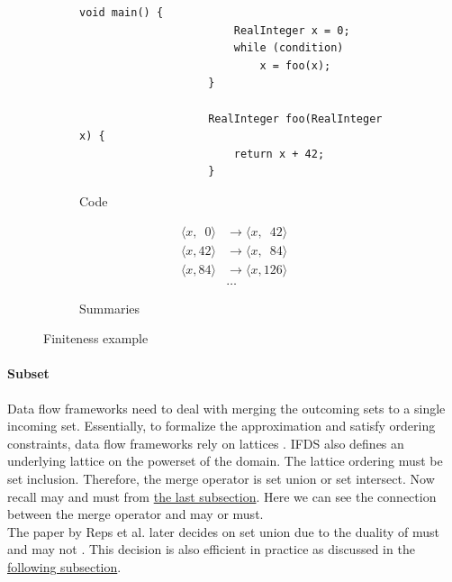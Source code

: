 \documentclass[../draft.tex]{subfiles}
\begin{document}
    \begin{figure}[ht]
        \centering
        \begin{subfigure}[b]{0.45\textwidth}
            \centering
            \begin{adjustbox}{max width=\columnwidth}
                \begin{lstlisting}[gobble=20, morekeywords={RealInteger}]
                    void main() {
                        RealInteger x = 0;
                        while (condition)
                            x = foo(x);
                    }
                    
                    RealInteger foo(RealInteger x) {
                        return x + 42;
                    }
                \end{lstlisting}
            \end{adjustbox}
            \caption{Code}
        \end{subfigure}
        \qquad
        \begin{subfigure}[b]{0.45\textwidth}
            \centering
            $$
                \begin{aligned}
                    \langle x, \phantom{0}0 \rangle &\rightarrow \langle x, \phantom{1}42 \rangle\\
                    \langle x, 42 \rangle &\rightarrow \langle x, \phantom{1}84 \rangle\\
                    \langle x, 84 \rangle &\rightarrow \langle x, 126 \rangle\\
                    &\dots
                \end{aligned}
            $$
            \caption{Summaries}
            \label{lst:ifdsfinite_b}
        \end{subfigure}
        \caption{Finiteness example}
        \label{lst:ifdsfinite}
    \end{figure}

    \paragraph{Subset} Data flow frameworks need to deal with merging the outcoming sets to a single incoming set. Essentially, to formalize the approximation and satisfy ordering constraints, data flow frameworks rely on lattices \cite{Khedker2009}. IFDS also defines an underlying lattice on the powerset of the domain. The lattice ordering must be set inclusion. Therefore, the merge operator is set union or set intersect. Now recall may and must from \hyperref[s:dataflow]{the last subsection}. Here we can see the connection between the merge operator and may or must.\\
    The paper by Reps et al. later decides on set union due to the duality of must and may not \cite{Reps1995}. This decision is also efficient in practice as discussed in the \hyperref[s:ifdspractical]{following subsection}.
\end{document}

